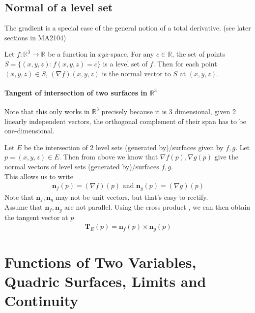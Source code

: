 \documentclass{article}
\begin{document}
\subsection{Normal of a level set}
The gradient is a special case of the general notion of a total derivative. (see later sections in MA2104)

Let $f:\mathbb{R}^3\rightarrow \mathbb{R}$ be a function in $xyz$-space. For any $c\in \mathbb{R}$, the set of points $S=\{(x,y,z): f(x,y,z)=c\}$ is a level set of $f$. Then for each point $(x,y,z)\in S$,  $(\nabla f)(x,y,z)$ is the normal vector to $S$ at $(x,y,z)$.

\paragraph{Tangent of intersection of two surfaces in $\mathbb{R}^3$} Note that this only works in $\mathbb{R}^3$ precisely because it is 3 dimensional, given 2 linearly independent vectors, the orthogonal complement of their span has to be one-dimensional.

Let $E$ be the intersection of 2 level sets (generated by)/surfaces given by $f,g$. Let $p=(x,y,z)\in E$. Then from above we know that $\nabla f(p),\nabla g(p)$ give the normal vectors of level sets (generated by)/surfaces $f,g$. \\
This allows us to write 
\begin{align*}
	\mathbf{n}_f(p) =  (\nabla f)(p) \text{ and } \mathbf{n}_g(p) =  (\nabla g)(p)
\end{align*}
Note that $\mathbf{n}_f,\mathbf{n}_g$ may not be unit vectors, but that's easy to rectify.\\
Assume that $\mathbf{n}_f,\mathbf{n}_g$ are not parallel. Using the cross product , we can then obtain the tangent vector at $p$
\begin{align*}
	\mathbf{T}_E(p) = \mathbf{n}_f(p) \times \mathbf{n}_g(p)
\end{align*}

\section{Functions of Two Variables, Quadric Surfaces, Limits and Continuity}
\end{document}
